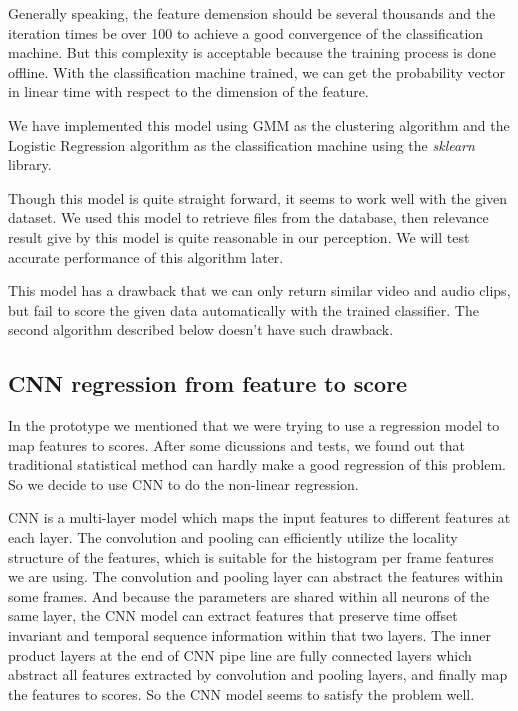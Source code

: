 \documentclass{report}
\begin{document}
Generally speaking, the feature demension should be several thousands and the iteration times be over 100 to achieve a good convergence of the classification machine. But this complexity is acceptable because the training process is done offline. With the classification machine trained, we can get the probability vector in linear time with respect to the dimension of the feature.

We have implemented this model using GMM as the clustering algorithm and the Logistic Regression algorithm as the classification machine using the \textit{sklearn} library.

Though this model is quite straight forward, it seems to work well with the given dataset. We used this model to retrieve files from the database, then relevance result give by this model is quite reasonable in our perception. We will test accurate performance of this algorithm later.

This model has a drawback that we can only return similar video and audio clips, but fail to score the given data automatically with the trained classifier. The second algorithm described below doesn’t have such drawback.

\subsection{CNN regression from feature to score}

In the prototype we mentioned that we were trying to use a regression model to map features to scores. After some dicussions and tests, we found out that traditional statistical method can hardly make a good regression of this problem. So we decide to use CNN to do the non-linear regression.

CNN is a multi-layer model which maps the input features to different features at each layer. The convolution and pooling can efficiently utilize the locality structure of the features, which is suitable for the histogram per frame features we are using. The convolution and pooling layer can abstract the features within some frames. And because the parameters are shared within all neurons of the same layer, the CNN model can extract features that preserve time offset invariant and temporal sequence information within that two layers. The inner product layers at the end of CNN pipe line are fully connected layers which abstract all features extracted by convolution and pooling layers, and finally map the features to scores. So the CNN model seems to satisfy the problem well.
\end{document}
